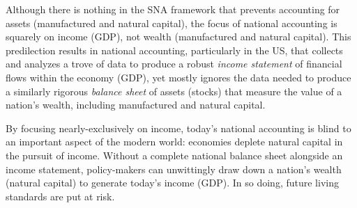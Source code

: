 
Although there is nothing in the SNA framework that prevents 
accounting for assets (manufactured and natural capital),
the focus of national accounting is squarely on income (GDP), 
not wealth (manufactured and natural capital).\cite[p.~415]{UNSNA2008}  
This predilection results in national accounting,
particularly in the US, that collects and analyzes a trove of data to
produce a robust \emph{income statement} of financial flows within the economy (GDP),
yet mostly ignores the data needed to produce a similarly rigorous
\emph{balance sheet} of assets (stocks) that measure the value 
of a nation's wealth, including manufactured and natural capital.

By focusing nearly-exclusively on income, 
today's national accounting is blind to an important aspect of the modern world:
economies deplete natural capital in the pursuit of income.
Without a complete national balance sheet alongside an income statement, 
policy-makers can unwittingly draw down a nation's wealth (natural capital) 
to generate today's income (GDP). 
In so doing, future living standards are put at risk. 

